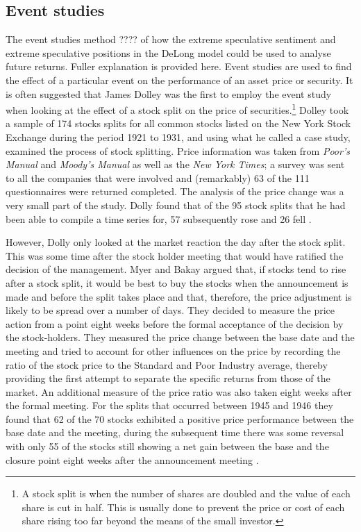 \documentclass[12pt, a4paper, oneside]{article} %
\begin{document}
\subsection{Event studies}
The event studies method ???? of how the extreme speculative sentiment and extreme speculative positions in the DeLong model could be used to analyse future returns.  Fuller explanation is provided here. Event studies are used to find the effect of a particular event on the performance of an asset price or security.  It is often suggested that James Dolley was the first to employ the event study when looking at the effect of a stock split on the price of securities.\footnote{A stock split is when the number of shares are doubled and the value of each share is cut in half.  This is usually done to prevent the price or cost of each share rising too far beyond the means of the small investor.}   Dolley took a sample of 174 stocks splits for all common stocks listed on the New York Stock Exchange during the period 1921 to 1931, and using what he called a case study, examined the process of stock splitting.  Price information was taken from \emph{Poor's Manual} and \emph{Moody's Manual} as well as the \emph{New York Times}; a survey was sent to all the companies that were involved and (remarkably) 63 of the 111 questionnaires were returned completed.  The analysis of the price change was a very small part of the study.  Dolly found that of the 95 stock splits that he had been able to compile a time series for, 57 subsequently rose and 26 fell \citep{Dolly1933}.     

However, Dolly only looked at the market reaction the day after the stock split.  This was some time after the stock holder meeting that would have ratified the decision of the management. Myer and Bakay argued that, if stocks tend to rise after a stock split, it would be best to buy the stocks when the announcement is made and before the split takes place and that, therefore, the price adjustment is likely to be spread over a number of days.  They decided to measure the price action from a point eight weeks before the formal acceptance of the decision by the stock-holders. They measured the price change between the base date and the meeting and tried to account for other influences on the price by recording the ratio of the stock price to the Standard and Poor Industry average, thereby providing the first attempt to separate the specific returns from those of the market.  An additional measure of the price ratio was also taken eight weeks after the formal meeting.  For the splits that occurred between 1945 and 1946 they found that 62 of the 70 stocks exhibited a positive price performance between the base date and the meeting, during the subsequent time there was some reversal with only 55 of the stocks still showing a net gain between the base and the closure point eight weeks after the announcement meeting \citep{MyersBakay}.
\end{document}
